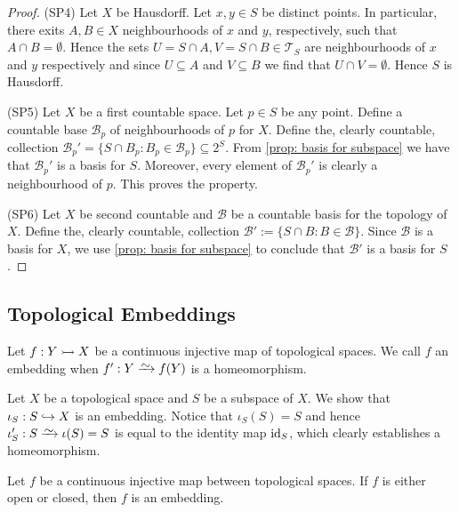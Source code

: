 \begin{proof}
  (SP4) Let \(X\) be Hausdorff. Let \(x, y \in S\) be distinct points. In
  particular, there exits \(A, B \in X\) neighbourhoods of \(x\) and \(y\),
  respectively, such that \(A \cap B = \emptyset\). Hence the sets \(U = S \cap
  A, V = S \cap B \in \mathcal T_S\) are neighbourhoods of \(x\) and \(y\)
  respectively and since \(U \subseteq A\) and \(V \subseteq B\) we find that
  \(U \cap V = \emptyset\). Hence \(S\) is Hausdorff.

  (SP5) Let \(X\) be a first countable space. Let \(p \in S\) be any point.
  Define a countable base \(\mathcal B_p\) of neighbourhoods of \(p\) for \(X\).
  Define the, clearly countable, collection \(\mathcal B_p' = \{S \cap B_p: B_p
  \in \mathcal B_p\} \subseteq 2^S\). From \cref{prop: basis for subspace} we
  have that \(\mathcal B_p'\) is a basis for \(S\). Moreover, every element of
  \(\mathcal B_p'\) is clearly a neighbourhood of \(p\). This proves the
  property.

  (SP6) Let \(X\) be second countable and \(\mathcal B\) be a countable basis
  for the topology of \(X\). Define the, clearly countable, collection
  \(\mathcal B' := \{S \cap B : B \in \mathcal B\}\). Since \(\mathcal B\) is a
  basis for \(X\), we use \cref{prop: basis for subspace} to conclude that
  \(\mathcal B'\) is a basis for \(S\).
\end{proof}

\subsection{Topological Embeddings}

\begin{definition}[Embedding]\label{def: topological embedding}
  Let \(f: Y \rightarrowtail X\) be a continuous injective map of topological spaces. We
  call \(f\) an embedding when \(f': Y \isoto f(Y)\) is a homeomorphism.
\end{definition}

\begin{example}
  Let \(X\) be a topological space and \(S\) be a subspace of \(X\). We show
  that \(\iota_S: S \hookrightarrow X\) is an embedding. Notice that
  \(\iota_S(S) = S\) and hence \(\iota_S': S \isoto \iota(S) = S\) is equal to
  the identity map \(\operatorname{id}_S\), which clearly establishes a homeomorphism.
\end{example}

\begin{proposition}
  Let \(f\) be a continuous injective map between topological spaces. If \(f\)
  is either open or closed, then \(f\) is an embedding.
\end{proposition}

